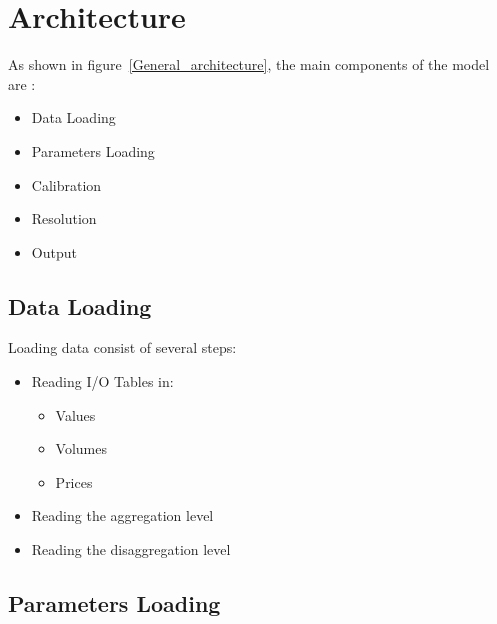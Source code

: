 \chapter{Architecture}

As shown in figure~\ref{General_architecture}, the main components of the model are :

\begin{itemize}
    \item Data Loading
    \item Parameters Loading
    \item Calibration
    \item Resolution
    \item Output
\end{itemize}

\section{Data Loading} %
\label{sec:data_loading}

Loading data consist of several steps:
\begin{itemize}
    \item Reading I/O Tables in:
    \begin{itemize}
        \item Values
        \item Volumes
        \item Prices
    \end{itemize}
    \item Reading the aggregation level
    \item Reading the disaggregation level
\end{itemize}

\section{Parameters Loading} %
\label{sec:parameters_loading}

